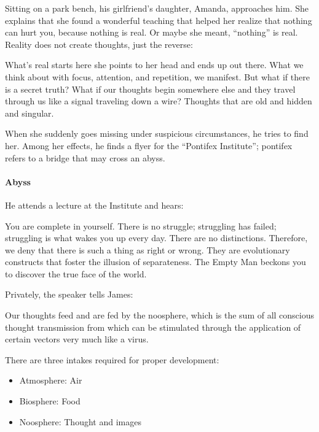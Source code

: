 Sitting on a park bench, his girlfriend's daughter, Amanda, approaches him. She explains that she found a wonderful teaching that helped her realize that nothing can hurt you, because nothing is real. Or maybe she meant, ``nothing'' is real. Reality does not create thoughts, just the reverse:

\begin{quotex}
What's real starts here she points to her head and ends up out there. What we think about with focus, attention, and repetition, we manifest. But what if there is a secret truth? What if our thoughts begin somewhere else and they travel through us like a signal traveling down a wire? Thoughts that are old and hidden and singular.
\end{quotex}


When she suddenly goes missing under suspicious circumstances, he tries to find her. Among her effects, he finds a flyer for the ``Pontifex Institute''; pontifex refers to a bridge that may cross an abyss.

\paragraph{Abyss}


He attends a lecture at the Institute and hears:

\begin{quotex}
You are complete in yourself. There is no struggle; struggling has failed; struggling is what wakes you up every day. There are no distinctions. Therefore, we deny that there is such a thing as right or wrong. They are evolutionary constructs that foster the illusion of separateness. The Empty Man beckons you to discover the true face of the world.
\end{quotex}


Privately, the speaker tells James:

\begin{quotex}
Our thoughts feed and are fed by the noosphere, which is the sum of all conscious thought transmission from which can be stimulated through the application of certain vectors very much like a virus.
\end{quotex}


There are three intakes required for proper development:

\begin{itemize}


\item Atmosphere: Air

\item Biosphere: Food

\item Noosphere: Thought and images
\end{itemize}



